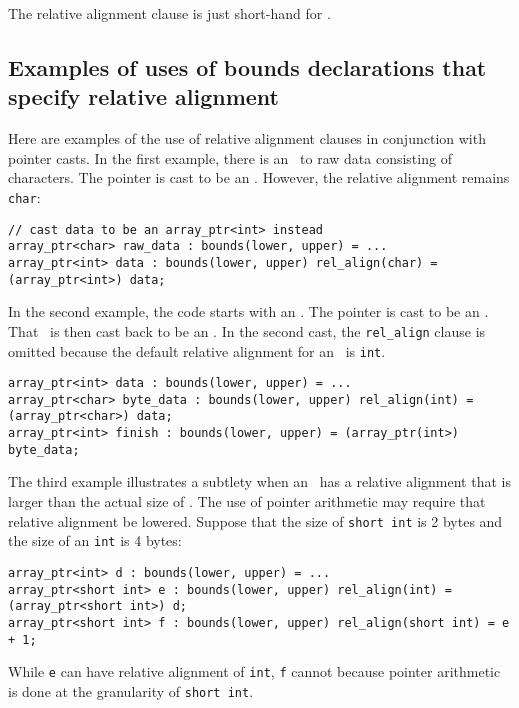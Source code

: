 The relative alignment clause 
is just short-hand for .

\subsection{Examples of uses of bounds declarations that specify relative alignment}

Here are examples of the use of relative alignment clauses in
conjunction with pointer casts. In the first example, there is an
\arrayptr\ to raw data consisting of characters. The pointer is
cast to be an \arrayptrint . However,
the relative alignment remains \texttt{char}:

\begin{verbatim}
// cast data to be an array_ptr<int> instead
array_ptr<char> raw_data : bounds(lower, upper) = ...
array_ptr<int> data : bounds(lower, upper) rel_align(char) = (array_ptr<int>) data;
\end{verbatim}

In the second example, the code starts with an
\arrayptrint. The pointer is cast to
be an \arrayptrchar. That
\arrayptr\ is then cast back to be an
\arrayptrint . In the second cast, the
\texttt{rel\_align} clause is omitted because the default relative
alignment for an \arrayptrint\ is
\texttt{int}.

\begin{verbatim}
array_ptr<int> data : bounds(lower, upper) = ...
array_ptr<char> byte_data : bounds(lower, upper) rel_align(int) = (array_ptr<char>) data;
array_ptr<int> finish : bounds(lower, upper) = (array_ptr(int>) byte_data;
\end{verbatim}

The third example illustrates a subtlety when an
\arrayptrT\ has a
relative alignment that is larger than the actual size of . The
use of pointer arithmetic may require that relative alignment be
lowered. Suppose that the size of \texttt{short int} is 2 bytes and the
size of an \texttt{int} is 4 bytes:

\begin{verbatim}
array_ptr<int> d : bounds(lower, upper) = ...
array_ptr<short int> e : bounds(lower, upper) rel_align(int) = (array_ptr<short int>) d;
array_ptr<short int> f : bounds(lower, upper) rel_align(short int) = e + 1;
\end{verbatim}

While \texttt{e} can have relative alignment of \texttt{int}, \texttt{f}
cannot because pointer arithmetic is done at the granularity of
\texttt{short int}.

